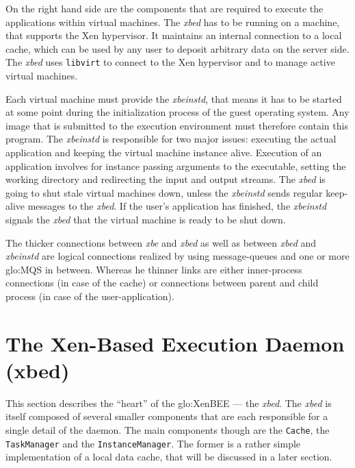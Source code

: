 \medskip

On the right hand side are the components that are required to execute the
applications within  virtual machines.  The \emph{xbed} has  to be running
on a machine, that supports  the Xen hypervisor.  It maintains an internal
connection to  a local  cache, which can  be used  by any user  to deposit
arbitrary data on the  server side.  The \emph{xbed} uses \texttt{libvirt}
to connect to the Xen hypervisor and to manage active virtual machines.

Each virtual machine  must provide the \emph{xbeinstd}, that  means it has
to be started at some point during the initialization process of the guest
operating system. Any image that is submitted to the execution environment
must therefore  contain this  program. The \emph{xbeinstd}  is responsible
for two  major issues:  executing the actual  application and  keeping the
virtual machine instance alive.   Execution of an application involves for
instance  passing  arguments  to   the  executable,  setting  the  working
directory and redirecting the input and output streams. The \emph{xbed} is
going  to shut  stale virtual  machines down,  unless  the \emph{xbeinstd}
sends  regular keep-alive  messages  to the  \emph{xbed}.   If the  user's
application has finished, the \emph{xbeinstd} signals the \emph{xbed} that
the virtual machine is ready to be shut down.

\medskip

The  thicker connections  between \emph{xbe}  and \emph{xbed}  as  well as
between \emph{xbed}  and \emph{xbeinstd} are  logical connections realized
by using message-queues and one  or more \gls{glo:MQS} in between. Whereas
he  thinner links  are either  inner-process connections  (in case  of the
cache) or  connections between  parent and child  process (in case  of the
user-application).

\section[The Xen-Based Execution Daemon]{The Xen-Based Execution Daemon (xbed)}
\label{sec:xbed}

This  section describes  the  ``heart'' of  the  \gls{glo:XenBEE} ---  the
\emph{xbed}.   The  \emph{xbed}  is  itself composed  of  several  smaller
components that  are each responsible for  a single detail  of the daemon.
The    main    components    though    are   the    \texttt{Cache},    the
\texttt{TaskManager}  and the  \texttt{InstanceManager}. The  former  is a
rather simple implementation of a local data cache, that will be discussed
in a later section.


